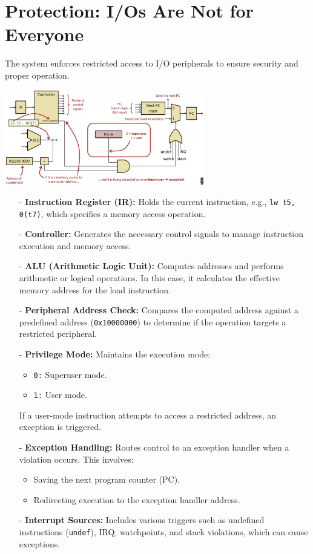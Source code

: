\section{Protection: I/Os Are Not for Everyone}
The system enforces restricted access to I/O peripherals to ensure security and proper operation. 
\begin{center}
    \includegraphics[width=0.65\textwidth]{chapters/chapter2d/images/admin.png}
\end{center}
\begin{itemize}
    \item[-] \textbf{Instruction Register (IR):} Holds the current instruction, e.g., \texttt{lw t5, 0(t7)}, which specifies a memory access operation.
    \item[-] \textbf{Controller:} Generates the necessary control signals to manage instruction execution and memory access.
    \item[-] \textbf{ALU (Arithmetic Logic Unit):} Computes addresses and performs arithmetic or logical operations. In this case, it calculates the effective memory address for the load instruction.
    \item[-] \textbf{Peripheral Address Check:} Compares the computed address against a predefined address (\texttt{0x10000000}) to determine if the operation targets a restricted peripheral.
    \item[-] \textbf{Privilege Mode:} Maintains the execution mode:
        \begin{itemize}
            \item \texttt{0:} Superuser mode.
            \item \texttt{1:} User mode.
        \end{itemize}
        If a user-mode instruction attempts to access a restricted address, an exception is triggered.
    \item[-] \textbf{Exception Handling:} Routes control to an exception handler when a violation occurs. This involves:
        \begin{itemize}
            \item Saving the next program counter (PC).
            \item Redirecting execution to the exception handler address.
        \end{itemize}
    \item[-] \textbf{Interrupt Sources:} Includes various triggers such as undefined instructions (\texttt{undef}), IRQ, watchpoints, and stack violations, which can cause exceptions.
\end{itemize}

